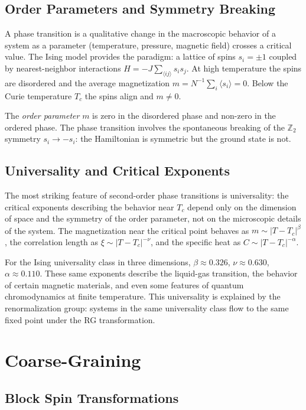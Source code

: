 \documentclass[12pt,a4paper,oneside]{book}
\theoremstyle{definition}
\theoremstyle{plain}
\theoremstyle{remark}
\begin{document}
\section{Order Parameters and Symmetry Breaking}

A phase transition is a qualitative change in the macroscopic behavior of a
system as a parameter (temperature, pressure, magnetic field) crosses a
critical value. The Ising model provides the paradigm: a lattice of spins
$s_i = \pm 1$ coupled by nearest-neighbor interactions $H = -J\sum_{\langle ij\rangle}s_i s_j$.
At high temperature the spins are disordered and the average magnetization
$m = N^{-1}\sum_i \langle s_i\rangle = 0$. Below the Curie temperature $T_c$
the spins align and $m \neq 0$.

The \emph{order parameter} $m$ is zero in the disordered phase and non-zero
in the ordered phase. The phase transition involves the spontaneous breaking
of the $\mathbb{Z}_2$ symmetry $s_i \to -s_i$: the Hamiltonian is symmetric
but the ground state is not.

\section{Universality and Critical Exponents}

The most striking feature of second-order phase transitions is universality:
the critical exponents describing the behavior near $T_c$ depend only on the
dimension of space and the symmetry of the order parameter, not on the
microscopic details of the system. The magnetization near the critical point
behaves as $m \sim |T - T_c|^\beta$, the correlation length as
$\xi \sim |T - T_c|^{-\nu}$, and the specific heat as $C \sim |T - T_c|^{-\alpha}$.

For the Ising universality class in three dimensions, $\beta \approx 0.326$,
$\nu \approx 0.630$, $\alpha \approx 0.110$. These same exponents describe
the liquid-gas transition, the behavior of certain magnetic materials, and
even some features of quantum chromodynamics at finite temperature. This
universality is explained by the renormalization group: systems in the same
universality class flow to the same fixed point under the RG transformation.

\chapter{Coarse-Graining}

\section{Block Spin Transformations}
\end{document}

